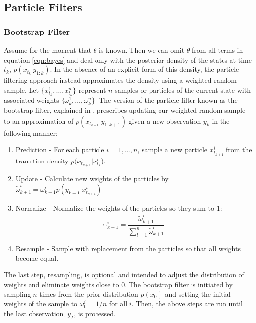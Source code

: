 \documentclass{article}
\begin{document}
\subsection{Particle Filters}

\subsubsection{Bootstrap Filter}

Assume for the moment that $\theta$ is known.  Then we can omit $\theta$ from all terms in equation \eqref{eqn:bayes} and deal only with the posterior density of the states at time $t_k$, $p(x_{t_k}|y_{1:k})$.  In the absence of an explicit form of this density, the particle filtering approach instead approximates the density using a weighted random sample.  Let $\{x_{t_k}^1,\ldots,x_{t_k}^n\}$ represent $n$ samples or particles of the current state with associated weights $\{\omega_k^1,\ldots,\omega_k^n\}$.  The version of the particle filter known as the bootstrap filter, explained in \citet{gordon}, prescribes updating our weighted random sample to an approximation of $p(x_{t_{k+1}}|y_{1:k+1})$ given a new observation $y_k$ in the following manner:

\begin{enumerate}
\item Prediction - For each particle $i = {1,\ldots,n}$, sample a new particle $x_{t_{k+1}}^i$ from the transition density $p(x_{t_{k+1}}|x_{t_k}^i$).
\item Update - Calculate new weights of the particles by $\tilde{\omega}_{k+1}^i = \omega_{k+1}^i p(y_{k+1}|x_{t_{k+1}}^i)$
\item Normalize - Normalize the weights of the particles so they sum to 1: \[\omega_{k+1}^i = \frac{\tilde{\omega}_{k+1}^i}{\sum_{l=1}^n \tilde{\omega}_{k+1}^l}\]
\item Resample - Sample with replacement from the particles so that all weights become equal.
\end{enumerate}

\noindent The last step, resampling, is optional and intended to adjust the distribution of weights and eliminate weights close to 0.  The bootstrap filter is initiated by sampling $n$ times from the prior distribution $p(x_0)$ and setting the initial weights of the sample to $\omega_0^i = 1/n$ for all $i$.  Then, the above steps are run until the last observation, $y_T$, is processed.
\end{document}
